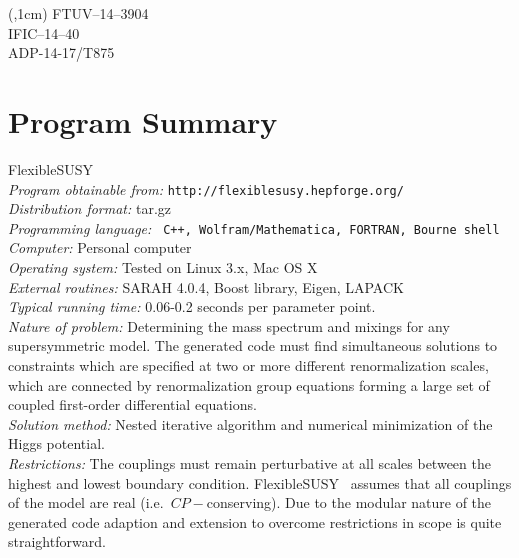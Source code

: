 \documentclass[final,3p,11pt,pdflatex]{elsarticle}
\makeatletter
\newcommand{\fs}{FlexibleSUSY\@\xspace}
\newcommand{\mathematica}{Mathematica\xspace}
\makeatother
\begin{document}
\begin{textblock*}{7em}(\textwidth,1cm)
\noindent\footnotesize
FTUV--14--3904 \\
IFIC--14--40 \\
ADP-14-17/T875
\end{textblock*}

\section{Program Summary}
 \fs\\ {\em Program obtainable from:}
         {\tt http://flexiblesusy.hepforge.org/}\\ {\em Distribution
           format:}\/ tar.gz\\ {\em Programming language:} {\tt
           C++, Wolfram/\mathematica, FORTRAN, Bourne shell}\\ {\em Computer:}\/ Personal computer\\ {\em Operating
           system:}\/ Tested on Linux 3.x, Mac OS X\\
         {\em External routines:}\/ SARAH 4.0.4, Boost library,
         Eigen, LAPACK\\ {\em
           Typical running time:}\/ 0.06-0.2 seconds per parameter
         point.\\ {\em Nature of problem:}\/ Determining the mass
         spectrum and mixings for any supersymmetric model. The
         generated code must find simultaneous solutions to
         constraints which are specified at two or more different
         renormalization scales, which are connected by
         renormalization group equations forming a large set of
         coupled first-order differential equations. \\ {\em Solution method:}\/
         Nested iterative algorithm and numerical minimization of the
         Higgs potential.  \\ {\em Restrictions:} The couplings must
         remain perturbative at all scales between the highest and
         lowest boundary condition.  \fs~ assumes that all couplings
         of the model are real (i.e.\ $CP-$conserving). Due to the
         modular nature of the generated code adaption and extension
         to overcome restrictions in scope is quite straightforward.





\newpage
\end{document}
